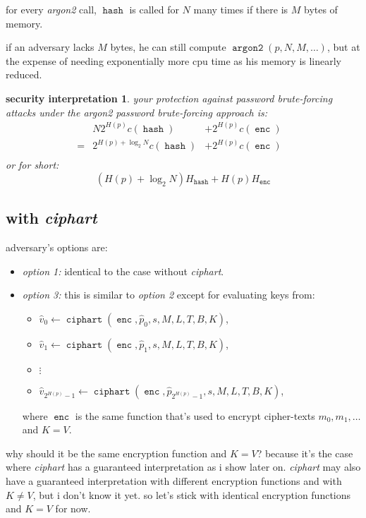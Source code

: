 \documentclass[twocolumn]{article}
\newtheorem{security}{security interpretation}
\DeclareMathOperator{\enc}{\texttt{enc}}
\DeclareMathOperator{\hash}{\texttt{hash}}
\DeclareMathOperator{\argon}{\texttt{argon2}}
\DeclareMathOperator{\ciphart}{\texttt{ciphart}}
\begin{document}
for every \emph{argon2} call, $\hash$ is called for $N$ many times if there
is $M$ bytes of memory.

if an adversary lacks $M$ bytes, he can still compute $\argon(p, N, M,
\ldots)$, but at the expense of needing exponentially more cpu time as his
memory is linearly reduced.

\begin{security}
your protection against password brute-forcing attacks under the
\emph{argon2} password brute-forcing approach is:
\begin{align*}
      & N 2^{H(p)} c(\hash)          & + 2^{H(p)} c(\enc) &\\
    = & 2^{H(p) + \log_2 N} c(\hash) & + 2^{H(p)} c(\enc) &\\
\end{align*}
or for short:
\[
    (H(p) + \log_2 N) H_{\hash} + H(p) H_{\enc}
\]
\end{security}

\subsection{with \emph{ciphart}}
adversary's options are:
\begin{itemize}
    \item \emph{option 1:} identical to the case without \emph{ciphart}.
    \item \emph{option 3:} this is similar to \emph{option 2} except for
    evaluating keys from:
    \begin{itemize}
        \item $\hat v_0 \gets \ciphart(\enc, \hat p_0, s, M, L, T, B, K)$,
        \item $\hat v_1 \gets \ciphart(\enc, \hat p_1, s, M, L, T, B, K)$,
        \item $\vdots$
        \item $\hat v_{2^{H(p)}-1} \gets \ciphart(\enc, \hat
        p_{2^{H(p)}-1}, s, M, L, T, B, K)$,
    \end{itemize}
    where $\enc$ is the same function that's used to encrypt cipher-texts $m_0,
    m_1, \ldots$ and $K = V$.
\end{itemize}

why should it be the same encryption function and $K=V$?  because it's the
case where \emph{ciphart} has a guaranteed interpretation as i show later
on.  \emph{ciphart} may also have a guaranteed interpretation with
different encryption functions and with $K \ne V$, but i don't know it yet.
so let's stick with identical encryption functions and $K=V$ for now.
\end{document}
